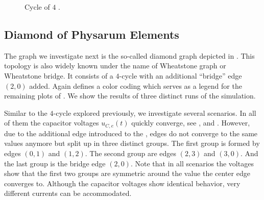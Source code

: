 		\begin{figure}
			\centering
			\qquad
			\newline
			\qquad
			\newline
			\qquad
			\newline
			\qquad
			
			\caption[Simulation - Cycles]{Cycle of $4$ \Pes.}
			\label{fig:cycle}
		\end{figure}

		\FloatBarrier

	\subsection{Diamond of Physarum Elements}

		The graph we investigate next is the so-called diamond graph depicted in . This topology is also widely known under the name of Wheatstone graph or Wheatstone bridge. It consists of a $4$-cycle with an additional ``bridge'' edge $(2,0)$ added. Again  defines a color coding which serves as a legend for the remaining plots of . We show the results of three distinct runs of the simulation.

		Similar to the $4$-cycle explored previously, we investigate several scenarios. In all of them the capacitor voltages $u_{C,e}(t)$ quickly converge, see ,  and . However, due to the additional edge introduced to the \Pn, edges do not converge to the same values anymore but split up in three distinct groups. The first group is formed by edges $(0,1)$ and $(1,2)$. The second group are edges $(2,3)$ and $(3,0)$. And the last group is the bridge edge $(2,0)$. Note that in all scenarios the voltages show that the first two groups are symmetric around the value the center edge converges to. Although the capacitor voltages show identical behavior, very different currents can be accommodated.

